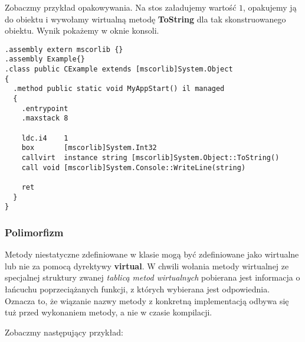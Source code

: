 Zobaczmy przykład opakowywania. Na stos załadujemy wartość $1$, opakujemy ją do obiektu i
wywołamy wirtualną metodę {\bf ToString} dla tak skonstruowanego obiektu. Wynik pokażemy w oknie konsoli.

\begin{scriptsize}
\begin{verbatim}
.assembly extern mscorlib {}
.assembly Example{} 
.class public CExample extends [mscorlib]System.Object
{ 
  .method public static void MyAppStart() il managed 
  { 
    .entrypoint 
    .maxstack 8

    ldc.i4    1
    box       [mscorlib]System.Int32
    callvirt  instance string [mscorlib]System.Object::ToString()
    call void [mscorlib]System.Console::WriteLine(string)
    
    ret 
  } 
}
\end{verbatim}
\end{scriptsize}

\subsubsection{Polimorfizm}

Metody niestatyczne zdefiniowane w klasie mogą być zdefiniowane jako wirtualne lub nie za
pomocą dyrektywy {\bf virtual}. W chwili wołania metody wirtualnej ze specjalnej struktury zwanej 
{\em tablicą metod wirtualnych} pobierana jest informacja o łańcuchu poprzeciążanych funkcji, z których
wybierana jest odpowiednia. Oznacza to, że wiązanie nazwy metody z konkretną implementacją odbywa się
tuż przed wykonaniem metody, a nie w czasie kompilacji.

Zobaczmy następujący przykład:

